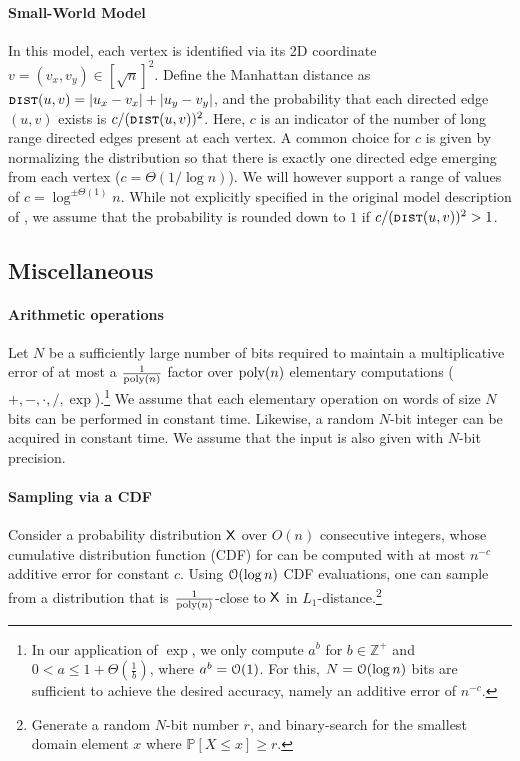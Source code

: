 \paragraph*{Small-World Model}
In this model, each vertex is identified via its 2D coordinate $v = (v_x, v_y) \in [\sqrt{n}]^2$. Define the Manhattan distance as $\texttt{\textsc{dist}}(u,v)=|u_x-v_x|+|u_y-v_y|$, and the probability that each directed edge $(u,v)$ exists is $c/(\texttt{\textsc{dist}}(u,v))^{2}$. Here, $c$ is an indicator of the number of long range directed edges present at each vertex. A common choice for $c$ is given by normalizing the distribution so that there is exactly one directed edge emerging from each vertex ($c = \Theta(1/\log n)$).
We will however support a range of values of $c=\log^{\pm\Theta(1)}n$.
While not explicitly specified in the original model description of \cite{kleinberg}, we assume that the probability is rounded down to $1$ if $c/(\texttt{\textsc{dist}}(u,v))^{2} > 1$.


\subsection{Miscellaneous}

\paragraph*{Arithmetic operations} Let $N$ be a sufficiently large number of bits required to maintain a multiplicative error of at most a $\frac{1}{\mathrm{poly}(n)}$ factor over $\mathrm{poly}(n)$ elementary computations ($+, -, \cdot, /, \exp$).\footnote{In our application of $\exp$, we only compute $a^b$ for $b \in \mathbb{Z}^+$ and $0 < a \leq 1+\Theta(\frac{1}{b})$, where $a^b = \Bo(1)$. For this, $N=\Bo(\log n)$ bits are sufficient to achieve the desired accuracy, namely an additive error of $n^{-c}$.} We assume that each elementary operation on words of size $N$ bits can be performed in constant time. Likewise, a random $N$-bit integer can be acquired in constant time. We assume that the input is also given with $N$-bit precision. %

\paragraph*{Sampling via a CDF}\label{para:CDF}
Consider a probability distribution $\mathsf{X}$ over $O(n)$ consecutive integers, whose cumulative distribution function (CDF) for can be computed with at most $n^{-c}$ additive error for constant $c$.
Using $\Bo(\log n)$ CDF evaluations, one can sample from a distribution that is
$\frac{1}{\mathrm{poly}(n)}$-close to $\mathsf{X}$ in $L_1$-distance.\footnote{Generate a random $N$-bit number $r$, and binary-search for the smallest domain element $x$ where $\mathbb P[X\leq x] \geq r$.}
